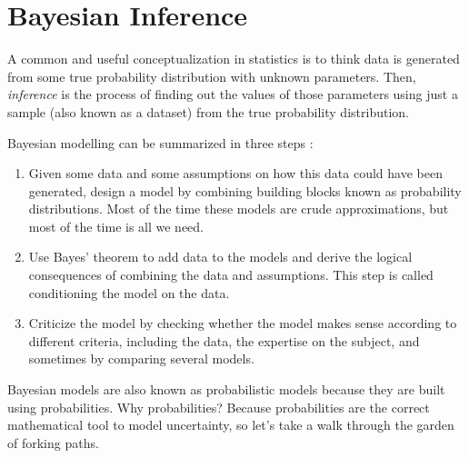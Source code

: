 
\chapter{Bayesian Inference}
\minitoc

A common and useful conceptualization in statistics is to think data is 
generated from some true probability distribution with unknown parameters. 
Then, \emph{inference} is the process of finding out the values of those parameters 
using just a sample (also known as a dataset) from the true probability 
distribution. \citep[pp. 12]{Martin:2018aa}

\citep{Gelman2013}

Bayesian modelling can be summarized in three steps \citep{Martin:2018aa}:
\begin{enumerate}
    \item Given some data and some assumptions on how this data could 
    have been generated, design a model by combining building blocks known
     as probability distributions. Most of the time these models are crude 
     approximations, but most of the time is all we need.

     \item Use Bayes' theorem to add data to the models and derive the 
     logical consequences of combining the data and assumptions. This step
     is called conditioning the model on the data.

     \item Criticize the model by checking whether the model makes 
     sense according to different criteria, including the data, the 
     expertise on the subject, and sometimes by comparing several models.
\end{enumerate}

Bayesian models are also known as probabilistic models because they are built
 using probabilities. Why probabilities? Because probabilities are the correct
  mathematical tool to model uncertainty, so let's take a walk through the garden
   of forking paths.

